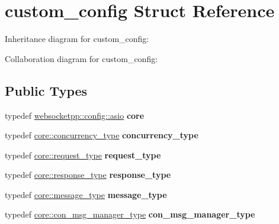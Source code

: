\hypertarget{structcustom__config}{}\section{custom\+\_\+config Struct Reference}
\label{structcustom__config}


Inheritance diagram for custom\+\_\+config\+:


Collaboration diagram for custom\+\_\+config\+:
\subsection*{Public Types}
\begin{DoxyCompactItemize}
\item 
\mbox{\label{structcustom__config_a4e505eac8b901b897d22f98cbc111e40}} 
typedef \mbox{\hyperlink{structwebsocketpp_1_1config_1_1asio}{websocketpp\+::config\+::asio}} {\bfseries core}
\item 
\mbox{\label{structcustom__config_a0469587f21d5e47fb277573474b090fd}} 
typedef \mbox{\hyperlink{classwebsocketpp_1_1concurrency_1_1basic}{core\+::concurrency\+\_\+type}} {\bfseries concurrency\+\_\+type}
\item 
\mbox{\label{structcustom__config_a03dc77bd84f6cc15cd01a5d9887c88e4}} 
typedef \mbox{\hyperlink{classwebsocketpp_1_1http_1_1parser_1_1request}{core\+::request\+\_\+type}} {\bfseries request\+\_\+type}
\item 
\mbox{\label{structcustom__config_a4537941e01e93674d6fa64b2f97c23e1}} 
typedef \mbox{\hyperlink{classwebsocketpp_1_1http_1_1parser_1_1response}{core\+::response\+\_\+type}} {\bfseries response\+\_\+type}
\item 
\mbox{\label{structcustom__config_aacf89133919af94588f72e29f0c128e4}} 
typedef \mbox{\hyperlink{classwebsocketpp_1_1message__buffer_1_1message}{core\+::message\+\_\+type}} {\bfseries message\+\_\+type}
\item 
\mbox{\label{structcustom__config_a878c46ec3657bf17a837e2f0ba305650}} 
typedef \mbox{\hyperlink{classwebsocketpp_1_1message__buffer_1_1alloc_1_1con__msg__manager}{core\+::con\+\_\+msg\+\_\+manager\+\_\+type}} {\bfseries con\+\_\+msg\+\_\+manager\+\_\+type}

\end{DoxyCompactItemize}
